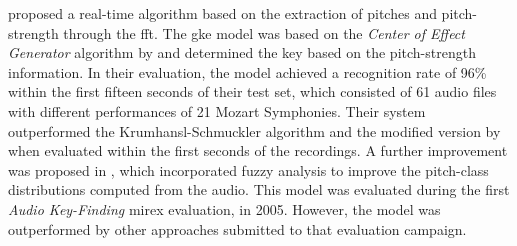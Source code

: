 

\textcite{chuan2005polyphonic} proposed a real-time
algorithm based on the extraction of pitches and
pitch-strength through the \acrfull{fft}. The \gls{gke}
model was based on the \emph{Center of Effect Generator}
algorithm by \textcite{chew2002spiral} and determined the
key based on the pitch-strength information. In their
evaluation, the model achieved a recognition rate of 96\%
within the first fifteen seconds of their test set, which
consisted of 61 audio files with different performances of
21 Mozart Symphonies. Their system outperformed the
Krumhansl-Schmuckler algorithm
\parencite{krumhansl1990cognitive} and the modified version
by \textcite{temperley1999whats} when evaluated within the
first seconds of the recordings. A further improvement was
proposed in \textcite{chuan2005fuzzy}, which incorporated
fuzzy analysis to improve the pitch-class distributions
computed from the audio. This model was evaluated during the
first \emph{Audio Key-Finding} \gls{mirex} evaluation, in
2005. However, the model was outperformed by other
approaches submitted to that evaluation
campaign.


